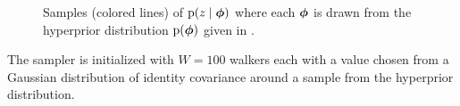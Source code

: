 \begin{figure}
	\caption{
		Samples (colored lines) of $\mathrm{p}(z \mid {\ensuremath{\boldsymbol{\phi}}})$ where each ${\boldsymbol{\phi}}$ is drawn from the hyperprior distribution $\mathrm{p}({\boldsymbol{\phi}})$ given in .}
\end{figure}

The sampler is initialized with $W=100$ walkers each with a value chosen from a Gaussian distribution of identity covariance around a sample from the hyperprior distribution.  


%


%


